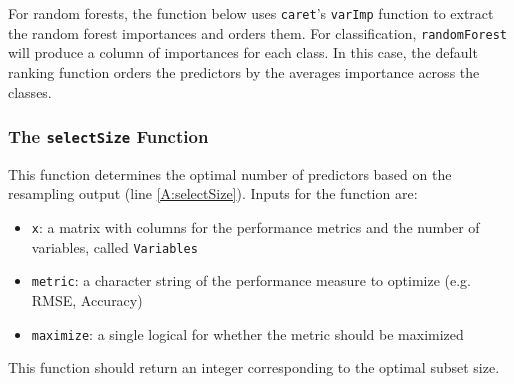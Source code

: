 \documentclass[12pt]{article}
\begin{document}
For random forests, the function below uses \texttt{caret}'s \texttt{varImp} function to extract the random forest importances and orders them. For classification, \texttt{randomForest} will produce a column of importances for each class. In this case, the default ranking function orders the predictors by the averages importance across the classes.
\begin{Schunk}
\end{Schunk}

\subsubsection{The \texttt{selectSize} Function}

This function determines the optimal number of predictors based on the resampling output (line \ref{A:selectSize}). Inputs for the function are:
\begin{itemize}
\item \texttt{x}: a matrix with columns for the performance metrics and the number of variables, called \texttt{Variables}
\item \texttt{metric}: a character string of the performance measure to optimize (e.g. RMSE, Accuracy)
\item \texttt{maximize}: a single logical for whether the metric should be maximized
\end{itemize}
This function should return an integer corresponding to the optimal subset size.
\end{document}
